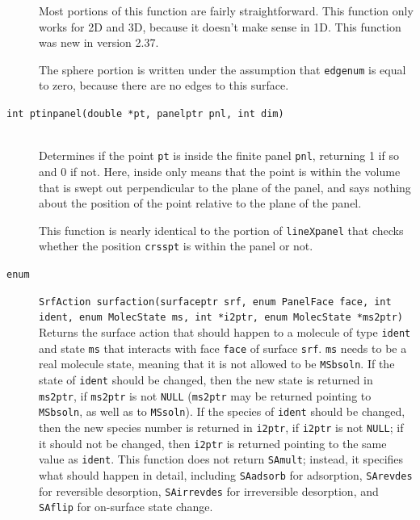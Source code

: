 \documentclass {scrbook}
\newcommand {\ttt} {\texttt}
\begin{document}
\begin{description}
Most portions of this function are fairly straightforward. This function only works for 2D and 3D, because it doesn't make sense in 1D. This function was new in version 2.37.

The sphere portion is written under the assumption that \ttt{edgenum} is equal to zero, because there are no edges to this surface.

\item[\ttt{int ptinpanel(double *pt, panelptr pnl, int dim)}]
\hfill \\
Determines if the point \ttt{pt} is inside the finite panel \ttt{pnl}, returning 1 if so and 0 if not. Here, inside only means that the point is within the volume that is swept out perpendicular to the plane of the panel, and says nothing about the position of the point relative to the plane of the panel.

This function is nearly identical to the portion of \ttt{lineXpanel} that checks whether the position \ttt{crsspt} is within the panel or not.

\item[\ttt{enum}]
\ttt{SrfAction surfaction(surfaceptr srf, enum PanelFace face, int ident, enum MolecState ms, int *i2ptr, enum MolecState *ms2ptr)}
\hfill \\
Returns the surface action that should happen to a molecule of type \ttt{ident} and state \ttt{ms} that interacts with face \ttt{face} of surface \ttt{srf}. \ttt{ms} needs to be a real molecule state, meaning that it is not allowed to be \ttt{MSbsoln}. If the state of \ttt{ident} should be changed, then the new state is returned in \ttt{ms2ptr}, if \ttt{ms2ptr} is not \ttt{NULL} (\ttt{ms2ptr} may be returned pointing to \ttt{MSbsoln}, as well as to \ttt{MSsoln}). If the species of \ttt{ident} should be changed, then the new species number is returned in \ttt{i2ptr}, if \ttt{i2ptr} is not \ttt{NULL}; if it should not be changed, then \ttt{i2ptr} is returned pointing to the same value as \ttt{ident}. This function does not return \ttt{SAmult}; instead, it specifies what should happen in detail, including \ttt{SAadsorb} for adsorption, \ttt{SArevdes} for reversible desorption, \ttt{SAirrevdes} for irreversible desorption, and \ttt{SAflip} for on-surface state change.


\end{description}
\end{document}
